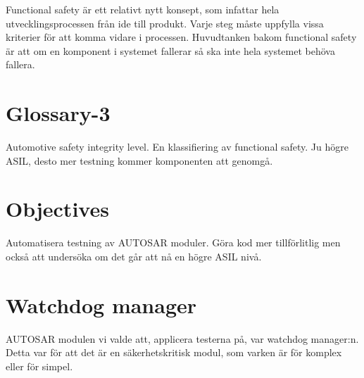 \documentclass[a4paper]{article}
\begin{document}
Functional safety är ett relativt nytt konsept, som infattar hela
utvecklingsprocessen från ide till produkt. Varje steg måste uppfylla
vissa kriterier för att komma vidare i processen.
Huvudtanken bakom functional safety är att om en komponent i systemet
fallerar så ska inte hela systemet behöva fallera.






\section{Glossary-3}
Automotive safety integrity level. En klassifiering av functional safety.
Ju högre ASIL, desto mer testning kommer komponenten att genomgå.


\section{Objectives}
Automatisera testning av AUTOSAR moduler. Göra
kod mer tillförlitlig men också att undersöka om det går att nå en högre
ASIL nivå.


\section{Watchdog manager}
AUTOSAR modulen vi valde att, applicera testerna på, var watchdog manager:n.
Detta var för att det är en säkerhetskritisk modul, som varken är för
komplex eller för simpel.

%
%
%
\end{document}

